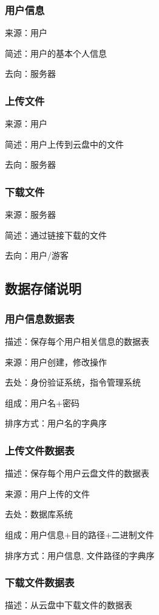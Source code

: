 \subsubsection{用户信息}
来源：用户

简述：用户的基本个人信息

去向：服务器

\subsubsection{上传文件}
来源：用户

简述：用户上传到云盘中的文件

去向：服务器

\subsubsection{下载文件}
来源：服务器

简述：通过链接下载的文件

去向：用户/游客

\subsection{数据存储说明}
\subsubsection{用户信息数据表}
描述：保存每个用户相关信息的数据表

来源：用户创建，修改操作

去处：身份验证系统，指令管理系统

组成：用户名+密码

排序方式：用户名的字典序

\subsubsection{上传文件数据表}
描述：保存每个用户云盘文件的数据表

来源：用户上传的文件

去处：数据库系统

组成：用户信息+目的路径+二进制文件

排序方式：用户信息, 文件路径的字典序

\subsubsection{下载文件数据表}
描述：从云盘中下载文件的数据表

